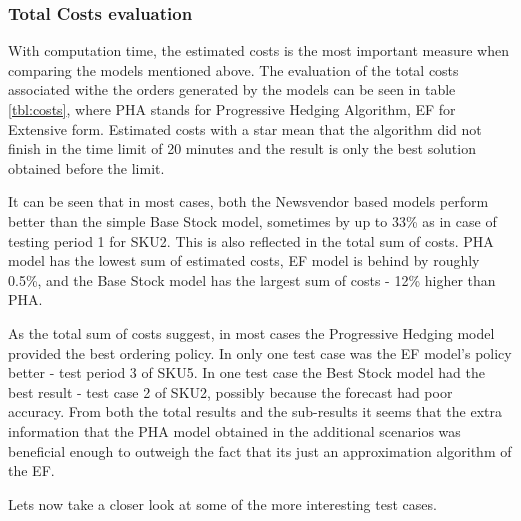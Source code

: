 \documentclass[11pt,a4paper]{article}
\begin{document}
\subsubsection{Total Costs evaluation}
With computation time, the estimated costs is the most important measure when comparing the models mentioned above. The evaluation of the total costs associated withe the orders generated by the models can be seen in table \ref{tbl:costs}, where PHA stands for Progressive Hedging Algorithm, EF for Extensive form. Estimated costs with a star mean that the algorithm did not finish in the time limit of 20 minutes and the result is only the best solution obtained before the limit.

It can be seen that in most cases, both the Newsvendor based models perform better than the simple Base Stock model, sometimes by up to 33\% as in case of testing period 1 for SKU2. This is also reflected in the total sum of costs. PHA model has the lowest sum of estimated costs, EF model is behind by roughly 0.5\%, and the Base Stock model has the largest sum of costs - 12\% higher than PHA.

As the total sum of costs suggest, in most cases the Progressive Hedging model provided the best ordering policy. In only one test case was the EF model's policy better - test period 3 of SKU5. In one test case the Best Stock model had the best result - test case 2 of SKU2, possibly because the forecast had poor accuracy.
From both the total results and the sub-results it seems that the extra information that the PHA model obtained
in the additional scenarios was beneficial enough to outweigh the fact that its just an approximation algorithm of the EF. 

Lets now take a closer look at some of the more interesting test cases.
\end{document}
